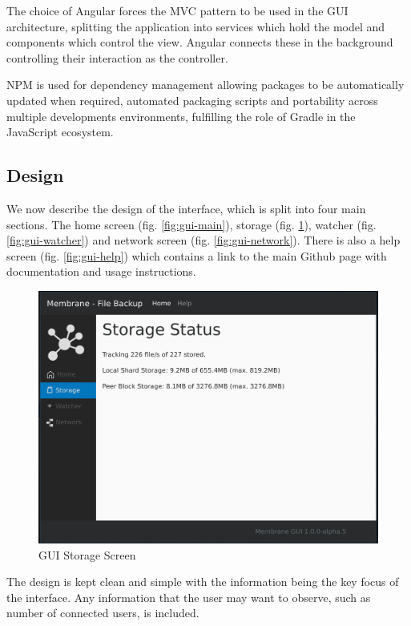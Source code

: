 \documentclass[11pt, a4paper, twoside]{report}
\begin{document}
The choice of Angular forces the MVC pattern to be used in the GUI architecture, splitting the application into services which hold the model and components which control the view. Angular connects these in the background controlling their interaction as the controller.

NPM is used for dependency management allowing packages to be automatically updated when required, automated packaging scripts and portability across multiple developments environments, fulfilling the role of Gradle in the JavaScript ecosystem.

\subsection{Design}

We now describe the design of the interface, which is split into four main sections. The home screen (fig. \ref{fig:gui-main}), storage (fig. \ref{fig:gui-storage}), watcher (fig. \ref{fig:gui-watcher}) and network screen (fig. \ref{fig:gui-network}). There is also a help screen (fig. \ref{fig:gui-help}) which contains a link to the main Github page with documentation and usage instructions.

\begin{figure}
 \centering
 \includegraphics[width=\textwidth]{gui-storage}
 \caption{GUI Storage Screen}
 \label{fig:gui-storage}
\end{figure}

The design is kept clean and simple with the information being the key focus of the interface. Any information that the user may want to observe, such as number of connected users, is included.
\end{document}
